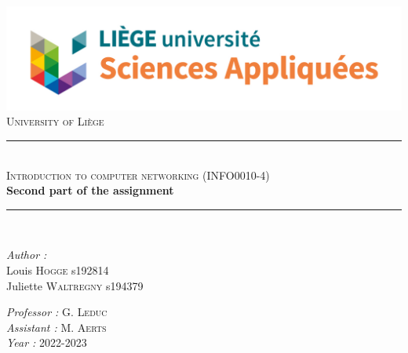 \documentclass[a4paper, 11pt]{article}
\newcommand{\HRule}{\rule{\linewidth}{0.5mm}}
\begin{document}
\begin{titlepage}

\begin{center}
\includegraphics[scale = 0.35]{logo.jpg}\\
\vspace{1cm}
\textsc{\huge University of Liège}\\[1.2cm]
\HRule \\[1cm]
\textsc{\LARGE Introduction to computer networking (INFO0010-4) }\\[1cm]
{\Huge \bfseries Second part of the assignment}\\[1.4cm] 
\HRule \\[1cm]
\end{center}

\begin{minipage}{0.45\linewidth}
      \begin{flushleft} \large
        \emph{Author : } \\
        Louis \textsc{Hogge}  s192814 \\
        Juliette \textsc{Waltregny}  s194379
      \end{flushleft}
\end{minipage}
\hfill
\begin{minipage}{0.45\linewidth}
      \begin{flushright} \large
        \emph{Professor : } G. \textsc{Leduc}\\
        \emph{Assistant : } M. \textsc{Aerts}\\
        \emph{Year : } 2022-2023 
      \end{flushright}
\end{minipage}

\end{titlepage}

\newpage
\end{document}

